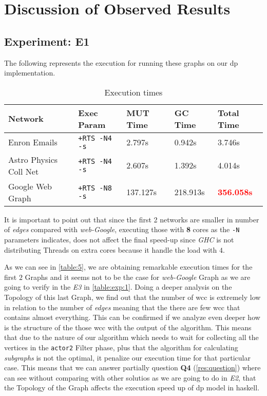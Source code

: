 \documentclass[preprint]{elsarticle}
\begin{document}
\section{\textbf{Discussion of Observed Results}}

\subsection{\textbf{Experiment: E1}}

The following represents the execution for running these graphs on our \acrshort{dp} implementation.

\begin{table}[H]
  \centering
  \begin{tabular}{|l|l|l|l|l|}
   \hline
   \textbf{Network} & \textbf{Exec Param} & \textbf{MUT Time} & \textbf{GC Time} & \textbf{Total Time}\\
   \hline
   Enron Emails & \texttt{+RTS -N4 -s} & 2.797s & 0.942s & 3.746s \\
   \hline
   Astro Physics Coll Net & \texttt{+RTS -N4 -s} & 2.607s & 1.392s & 4.014s \\
   \hline
   Google Web Graph & \texttt{+RTS -N8 -s} & 137.127s & 218.913s & \textbf{\textcolor{red}{356.058s}} \\
   \hline
  \end{tabular}
 \caption{Execution times}
 \label{table:5}
 \end{table}

It is important to point out that since the first 2 networks are smaller in number of \emph{edges} compared with \emph{web-Google}, executing those with \textbf{8} cores as the \texttt{-N} parameters indicates, does not affect the final speed-up since \emph{GHC} is not distributing Threads on extra cores because it handle the load with $4$.

As we can see in \autoref{table:5}, we are obtaining remarkable execution times for the first $2$ Graphs and it seems not to be the case for \textit{web-Google} Graph as we are going to verify in the \emph{E3} in \autoref{table:exp:1}.
Doing a deeper analysis on the Topology of this last Graph, we find out that the number of \acrshort{wcc} is extremely low in relation to the number of \emph{edges} meaning that the there are few \acrshort{wcc} that contains almost everything. This can be confirmed if we analyze even deeper how is the structure of the those \acrshort{wcc} with the output of the algorithm. This means that due to the nature of our algorithm which needs to wait for collecting all the vertices in the \texttt{actor2} Filter phase, plus that the algorithm for calculating \emph{subgraphs} is not the  optimal, it penalize our execution time for that particular case. This means that we can answer partially question \textbf{Q4} (\autoref{res:question}) where can see without comparing with other solutios as we are going to do in \emph{E2}, that the Topology of the Graph affects the execution speed up of \acrshort{dp} model in \acrshort{haskell}.
\end{document}
